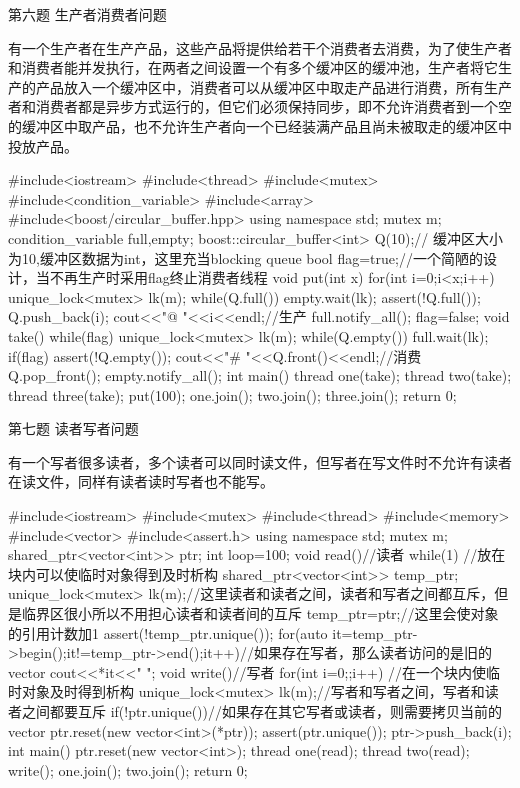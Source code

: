 第六题 生产者消费者问题

有一个生产者在生产产品，这些产品将提供给若干个消费者去消费，为了使生产者和消费者能并发执行，在两者之间设置一个有多个缓冲区的缓冲池，生产者将它生产的产品放入一个缓冲区中，消费者可以从缓冲区中取走产品进行消费，所有生产者和消费者都是异步方式运行的，但它们必须保持同步，即不允许消费者到一个空的缓冲区中取产品，也不允许生产者向一个已经装满产品且尚未被取走的缓冲区中投放产品。

\begin{Code}
	#include<iostream>
	#include<thread>
	#include<mutex>
	#include<condition_variable>
	#include<array>
	#include<boost/circular_buffer.hpp>
	using namespace std;
	mutex m;
	condition_variable full,empty;
	boost::circular_buffer<int> Q(10);// 缓冲区大小为10,缓冲区数据为int，这里充当blocking queue
	bool flag=true;//一个简陋的设计，当不再生产时采用flag终止消费者线程
	void put(int x){
		for(int i=0;i<x;i++){
			unique_lock<mutex> lk(m);
			while(Q.full())
			empty.wait(lk);
			assert(!Q.full());
			Q.push_back(i);
			cout<<"@ "<<i<<endl;//生产
			full.notify_all();
		}
		flag=false;
	}
	void take(){
		while(flag){
			unique_lock<mutex> lk(m);
			while(Q.empty())
			full.wait(lk);
			if(flag){
				assert(!Q.empty());
				cout<<"# "<<Q.front()<<endl;//消费
				Q.pop_front();
				empty.notify_all();
			}
		}
	}
	int main(){
		thread one(take);
		thread two(take);
		thread three(take);
		put(100);
		one.join();
		two.join();
		three.join();
		return 0;
	}
\end{Code}

第七题 读者写者问题

有一个写者很多读者，多个读者可以同时读文件，但写者在写文件时不允许有读者在读文件，同样有读者读时写者也不能写。

\begin{Code}
	#include<iostream>
	#include<mutex>
	#include<thread>
	#include<memory>
	#include<vector>
	#include<assert.h>
	using namespace std;
	mutex m;
	shared_ptr<vector<int>> ptr;
	int loop=100;
	void read(){//读者
		while(1){
			{//放在块内可以使临时对象得到及时析构
				shared_ptr<vector<int>> temp_ptr;
				{
					unique_lock<mutex> lk(m);//这里读者和读者之间，读者和写者之间都互斥，但是临界区很小所以不用担心读者和读者间的互斥
					temp_ptr=ptr;//这里会使对象的引用计数加1
					assert(!temp_ptr.unique());
				}
				for(auto it=temp_ptr->begin();it!=temp_ptr->end();it++)//如果存在写者，那么读者访问的是旧的vector
				cout<<*it<<" ";
			}
		}
	}
	void write(){//写者
		for(int i=0;;i++){
			{//在一个块内使临时对象及时得到析构
				unique_lock<mutex> lk(m);//写者和写者之间，写者和读者之间都要互斥
				if(!ptr.unique())//如果存在其它写者或读者，则需要拷贝当前的vector
				ptr.reset(new vector<int>(*ptr));
				assert(ptr.unique());
				ptr->push_back(i);
			}
		}
	}
	int main(){
		ptr.reset(new vector<int>);
		thread one(read);
		thread two(read);
		write();
		one.join();
		two.join();
		return 0;
	}
\end{Code}